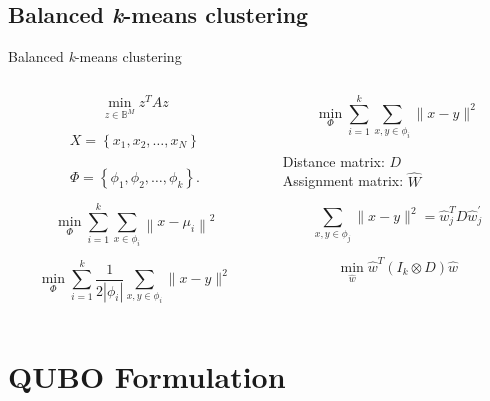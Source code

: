 \subsection{Balanced \textit{k}-means clustering}
	\begin{frame}{Balanced \textit{k}-means clustering}
		\begin{columns}
			\begin{column}{0.5\textwidth}
				$$\min _{z \in \mathbb{B}^{M}} z^{T} A z$$

				$$X=\left\{x_{1}, x_{2}, \ldots, x_{N}\right\}$$\\$$\Phi=\left\{\phi_{1}, \phi_{2}, \ldots, \phi_{k}\right\} .$$

				$$\min _{\Phi} \sum_{i=1}^{k} \sum_{x \in \phi_{i}}\left\|x-\mu_{i}\right\|^{2}$$

				$$\min _{\Phi} \sum_{i=1}^{k} \frac{1}{2\left|\phi_{i}\right|} \sum_{x, y \in \phi_{i}}\|x-y\|^{2}$$

			\end{column}
			\begin{column}{0.5\textwidth}  
				$$\min _{\Phi} \sum_{i=1}^{k} \sum_{x, y \in \phi_{i}}\|x-y\|^{2}$$

				Distance matrix: $D$ \\Assignment matrix: $\hat W$

				$$\sum_{x, y \in \phi_{j}}\|x-y\|^{2}=\hat{w}_{j}^{T} D \hat{w}_{j}^{\prime}$$

				$$\min _{\hat{w}} \hat{w}^{T}\left(I_{k} \otimes D\right) \hat{w}$$

			\end{column}
		\end{columns}
	\end{frame}



\section{QUBO Formulation}
